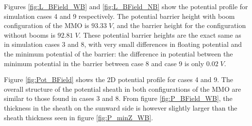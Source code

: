 Figures \ref{fig:L_BField_WB} and \ref{fig:L_BField_NB} show the potential profile for simulation cases 4 and 9 respectively. The potential barrier height with boom configuration of the MMO is $93.33 \; V$, and the barrier height for the configuration without booms is $92.81 \; V$. These potential barrier heights are the exact same as in simulation cases 3 and 8, with very small differences in floating potential and the minimum potential of the barrier: the difference in potential between the minimum potential in the barrier between case 8 and case 9 is only $0.02 \; V$.

Figure \ref{fig:Pot_BField} shows the 2D potential profile for cases 4 and 9. The overall structure of the potential sheath in both configurations of the MMO are similar to those found in cases 3 and 8. From figure \ref{fig:P_BField_WB}, the thickness in the sheath on the sunward side is however slightly larger than the sheath thickness seen in figure \ref{fig:P_minZ_WB}.


